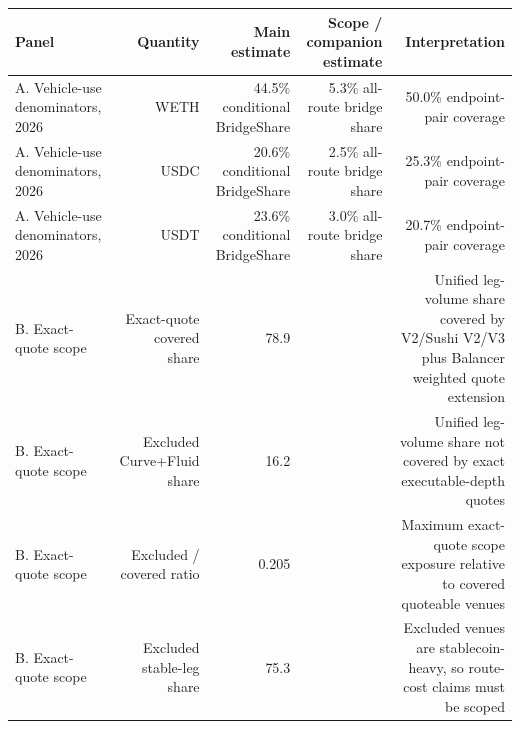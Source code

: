 \begin{tabular}{lrrrr}
\toprule
Panel & Quantity & Main estimate & Scope / companion estimate & Interpretation \\
\midrule
A. Vehicle-use denominators, 2026 & WETH & 44.5\% conditional BridgeShare & 5.3\% all-route bridge share & 50.0\% endpoint-pair coverage \\
A. Vehicle-use denominators, 2026 & USDC & 20.6\% conditional BridgeShare & 2.5\% all-route bridge share & 25.3\% endpoint-pair coverage \\
A. Vehicle-use denominators, 2026 & USDT & 23.6\% conditional BridgeShare & 3.0\% all-route bridge share & 20.7\% endpoint-pair coverage \\
B. Exact-quote scope & Exact-quote covered share & 78.9 &  & Unified leg-volume share covered by V2/Sushi V2/V3 plus Balancer weighted quote extension \\
B. Exact-quote scope & Excluded Curve+Fluid share & 16.2 &  & Unified leg-volume share not covered by exact executable-depth quotes \\
B. Exact-quote scope & Excluded / covered ratio & 0.205 &  & Maximum exact-quote scope exposure relative to covered quoteable venues \\
B. Exact-quote scope & Excluded stable-leg share & 75.3 &  & Excluded venues are stablecoin-heavy, so route-cost claims must be scoped \\
\bottomrule
\end{tabular}
